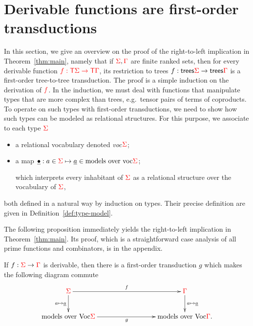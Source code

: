 \newcommand{\Root}[1]{\mathsf{root}_{#1}}
\newcommand{\Port}[1]{\mathsf{port}_{#1}}
\newcommand{\Interface}[1]{\mathsf{Interface}_{#1}}
\section{Derivable functions are first-order transductions}
\label{sec:to-transductions}
In this section, we give an overview on the proof of the right-to-left implication in Theorem~\ref{thm:main}, namely that if ${\color{red}{\Sigma}},{\color{red}{\Gamma}}$ are finite ranked sets, then for every derivable function ${\color{red}{f : {\color{red}{\mathsf T}}{\color{red}{\Sigma}}\to {\color{red}{\mathsf T}}{\color{red}{\Gamma}}}}$, its restriction to trees $f : \mathsf {trees} {\color{red}{\Sigma}} \to \mathsf {trees} {\color{red}{\Gamma}}$
is a first-order tree-to-tree transduction. The proof is a simple induction on the derivation of  ${\color{red}{f}}$. In the induction, we must deal with functions that manipulate types that are more complex than trees, e.g.~tensor pairs of terms of coproducts.  To operate on such types with first-order transductions, we need to show how such types can be modeled as relational structures. For this purpose, we associate to each type ${\color{red}{\Sigma}}$
\begin{itemize}
\item a relational vocabulary denoted  \emph{voc$ {\color{red}{\Sigma}}$};
\item a map $\underline{\bullet}: a \in {\color{red}{\Sigma}}  \mapsto \underline a \in \text{models over voc$ {\color{red}{\Sigma}}$}$;

    which interprets every inhabitant of ${\color{red}{\Sigma}}$ as a relational structure over the vocabulary of ${\color{red}{\Sigma}}$,
\end{itemize}
both defined in a natural way by induction on types. Their precise definition are given in  Definition~\ref{def:type-model}.
    \smallskip

The following proposition immediately yields the right-to-left implication in Theorem~\ref{thm:main}. Its proof, which is a straightforward case analysis of all prime functions and combinators, is in the appendix. 


  
\begin{proposition}\label{prop:to-logic} If $f : {\color{red}{\Sigma}} \to {\color{red}{\Gamma}}$ is derivable, then there is a first-order transduction $g$ 
    which makes the following diagram commute
    \begin{align*}
        \xymatrix@C=3cm{
            \rSigma \ar[d]_{a \mapsto \underline a}\ar[r]^f &  \rGamma \ar[d]^{a \mapsto \underline a} \\
            \text{models over  Voc$\rSigma$} \ar[r]_g &  \text{models over Voc$ \rGamma$}.
        } 
    \end{align*}
\end{proposition}



